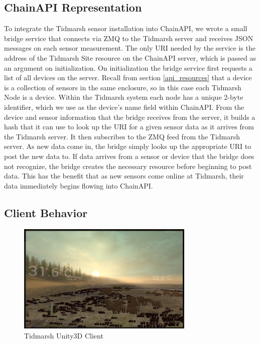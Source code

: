 \documentclass{acm_proc_article-sp}
\begin{document}
\subsection{ChainAPI Representation}

To integrate the Tidmarsh sensor installation into ChainAPI, we wrote a small
bridge service that connects via ZMQ to the Tidmarsh server and receives JSON
messages on each sensor measurement. The only URI needed by the service
is the address of the Tidmarsh Site resource on the ChainAPI server, which is
passed as an argument on initialization. On initialization the bridge service
first requests a list of all devices on the server. Recall from section
\ref{api_resources} that a device is a collection of sensors in the same
enclosure, so in this case each Tidmarsh Node is a device. Within the Tidmarsh
system each node has a unique 2-byte identifier, which we use as the device's
name field within ChainAPI. From the device and sensor information that the
bridge receives from the server, it builds a hash that it can use to look up
the URI for a given sensor data as it arrives from the Tidmarsh server. It then
subscribes to the ZMQ feed from the Tidmarsh server. As new data come in, the
bridge simply looks up the appropriate URI to post the new data to. If data
arrives from a sensor or device that the bridge does not recognize, the bridge
creates the necessary resource before beginning to post data. This has the
benefit that as new sensors come online at Tidmarsh, their data immediately
begins flowing into ChainAPI.

\subsection{Client Behavior}

\begin{figure}
    \centering
    \includegraphics[width=8.45cm]{tidmarsh_screenshot}
    \caption{Tidmarsh Unity3D Client}
    \label{tidmarsh_screenshot}
\end{figure}
\end{document}
